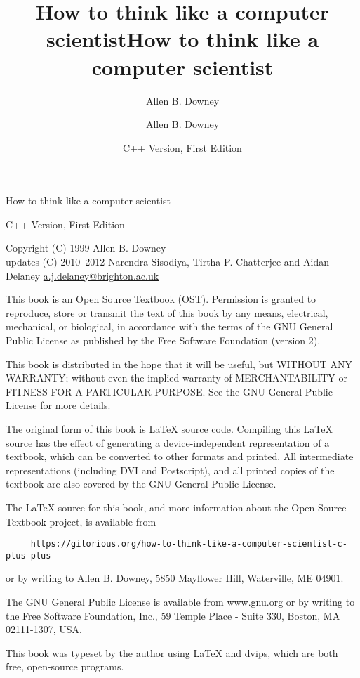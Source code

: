 \documentclass{book}
\title{How to think like a computer scientist}
\author{Allen B. Downey}
\date{}
\begin{document}
\title {How to think like a computer scientist}
\author {Allen B. Downey}
\date {C++ Version, First Edition}
\maketitle

\vspace{2in}
\begin{center}
{\Large How to think like a computer scientist}

C++ Version, First Edition
\vspace{0.25in}

Copyright (C) 1999  Allen B. Downey\\
updates (C) 2010--2012 Narendra Sisodiya, Tirtha P. Chatterjee and Aidan Delaney \url{a.j.delaney@brighton.ac.uk}
\end{center}
\vspace{0.25in}

This book is an Open Source Textbook (OST).  Permission is
granted to reproduce, store or transmit the text of this
book by any means, electrical, mechanical, or biological,
in accordance with the terms of the GNU General Public License as
published by the Free Software Foundation (version 2).

This book is distributed in the hope that it will be useful,
but WITHOUT ANY WARRANTY; without even the implied warranty of
MERCHANTABILITY or FITNESS FOR A PARTICULAR PURPOSE.  See the GNU
General Public License for more details.

The original form of this book is LaTeX source code.
Compiling this LaTeX source has the effect of generating
a device-independent representation of a textbook, which
can be converted to other formats and printed.  All intermediate
representations (including DVI and Postscript), and all printed
copies of the textbook are also covered by the GNU General
Public License.

The LaTeX source for this book, and more information about
the Open Source Textbook project, is available from

\begin{verbatim}
     https://gitorious.org/how-to-think-like-a-computer-scientist-c-plus-plus
\end{verbatim}
%
or by writing to Allen B. Downey, 5850 Mayflower Hill,
Waterville, ME 04901.

The GNU General Public License is available from
www.gnu.org or by writing to the Free Software Foundation,
Inc., 59 Temple Place - Suite 330, Boston, MA 02111-1307, USA.

This book was typeset by the author using LaTeX and dvips,
which are both free, open-source programs.


\frontmatter
\tableofcontents

\mainmatter
















\appendix


\printindex
\end{document}
